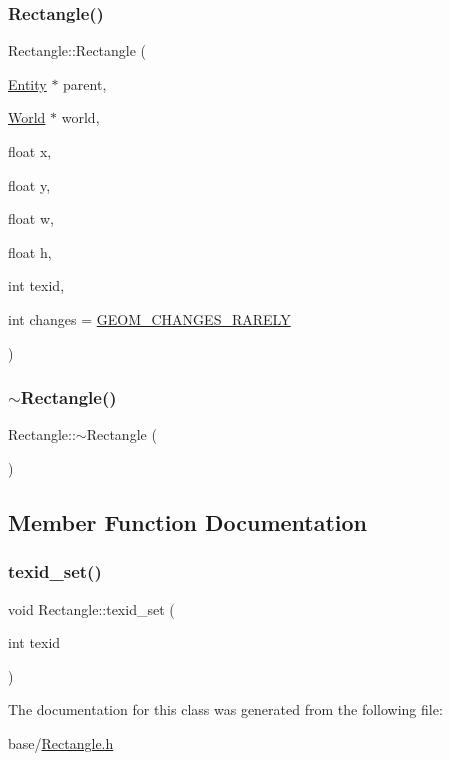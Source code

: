 \subsubsection{\texorpdfstring{Rectangle()}{Rectangle()}}
{\footnotesize\ttfamily Rectangle\+::\+Rectangle (\begin{DoxyParamCaption}\item[{\mbox{\hyperlink{classEntity}{Entity}} $\ast$}]{parent,  }\item[{\mbox{\hyperlink{classWorld}{World}} $\ast$}]{world,  }\item[{float}]{x,  }\item[{float}]{y,  }\item[{float}]{w,  }\item[{float}]{h,  }\item[{int}]{texid,  }\item[{int}]{changes = {\ttfamily \mbox{\hyperlink{World_8h_adf764cbdea00d65edcd07bb9953ad2b7afd62cb9ff74dd66a2597e9c31e205cba}{G\+E\+O\+M\+\_\+\+C\+H\+A\+N\+G\+E\+S\+\_\+\+R\+A\+R\+E\+LY}}} }\end{DoxyParamCaption})}

\mbox{\label{classRectangle_a494c076b13aadf26efdce07d23c61ddd}} 
\subsubsection{\texorpdfstring{$\sim$\+Rectangle()}{~Rectangle()}}
{\footnotesize\ttfamily Rectangle\+::$\sim$\+Rectangle (\begin{DoxyParamCaption}{ }\end{DoxyParamCaption})}



\subsection{Member Function Documentation}
\mbox{\label{classRectangle_a9f4fc658d7de3025befe7558b804dfec}} 
\subsubsection{\texorpdfstring{texid\+\_\+set()}{texid\_set()}}
{\footnotesize\ttfamily void Rectangle\+::texid\+\_\+set (\begin{DoxyParamCaption}\item[{int}]{texid }\end{DoxyParamCaption})}



The documentation for this class was generated from the following file\+:\begin{DoxyCompactItemize}
\item 
base/\mbox{\hyperlink{Rectangle_8h}{Rectangle.\+h}}\end{DoxyCompactItemize}
